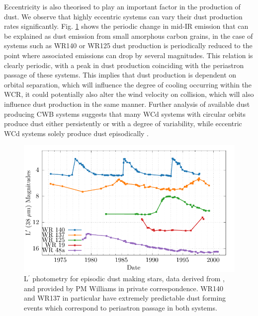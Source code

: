 Eccentricity is also theorised to play an important factor in the production of dust.
We observe that highly eccentric systems can vary their dust production rates significantly.
Fig. \ref{fig:periodicmags} shows the periodic change in mid-IR emission that can be explained as dust emission from small amorphous carbon grains, in the case of systems such as WR140 or WR125 dust production is periodically reduced to the point where associated emissions can drop by several magnitudes.
This relation is clearly periodic, with a peak in dust production coinciding with the periastron passage of these systems.
This implies that dust production is dependent on orbital separation, which will influence the degree of cooling occurring within the WCR, it could potentially also alter the wind velocity on collision, which will also influence dust production in the same manner.
Further analysis of available dust producing CWB systems suggests that many WCd systems with circular orbits produce dust either persistently or with a degree of variability, while eccentric WCd systems solely produce dust episodically \parencite{crowther_dust_2003,williamsVariableDustEmission2019}.

\begin{figure}[h]
  \centering
  \includegraphics[]{assets/magnitudes/magnitudes.pdf}
  \caption[L$^\prime$ photometry of episodic dust making stars]{L$^\prime$ photometry for episodic dust making stars, data derived from \textcite{crowther_dust_2003}, and provided by PM Williams in private correspondence. WR140 and WR137 in particular have extremely predictable dust forming events which correspond to periastron passage in both systems.}
  \label{fig:periodicmags}
\end{figure}

